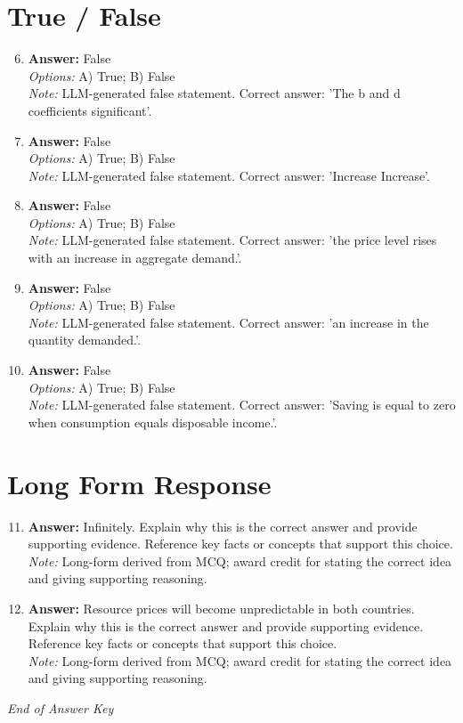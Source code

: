 \documentclass[12pt]{article}
\begin{document}
\section*{True / False}
\begin{enumerate}[label=\arabic*.]
\setcounter{enumi}{5}
\item \textbf{Answer:} False
\\ \textit{Options:} A) True; B) False
\\ \textit{Note:} LLM-generated false statement. Correct answer: 'The b and d coefficients significant'.
\item \textbf{Answer:} False
\\ \textit{Options:} A) True; B) False
\\ \textit{Note:} LLM-generated false statement. Correct answer: 'Increase Increase'.
\item \textbf{Answer:} False
\\ \textit{Options:} A) True; B) False
\\ \textit{Note:} LLM-generated false statement. Correct answer: 'the price level rises with an increase in aggregate demand.'.
\item \textbf{Answer:} False
\\ \textit{Options:} A) True; B) False
\\ \textit{Note:} LLM-generated false statement. Correct answer: 'an increase in the quantity demanded.'.
\item \textbf{Answer:} False
\\ \textit{Options:} A) True; B) False
\\ \textit{Note:} LLM-generated false statement. Correct answer: 'Saving is equal to zero when consumption equals disposable income.'.
\end{enumerate}

\section*{Long Form Response}
\begin{enumerate}[label=\arabic*.]
\setcounter{enumi}{10}
\item \textbf{Answer:} Infinitely. Explain why this is the correct answer and provide supporting evidence. Reference key facts or concepts that support this choice.
\\ \textit{Note:} Long-form derived from MCQ; award credit for stating the correct idea and giving supporting reasoning.
\item \textbf{Answer:} Resource prices will become unpredictable in both countries. Explain why this is the correct answer and provide supporting evidence. Reference key facts or concepts that support this choice.
\\ \textit{Note:} Long-form derived from MCQ; award credit for stating the correct idea and giving supporting reasoning.
\end{enumerate}

\vfill
\noindent\textit{End of Answer Key}
\end{document}
